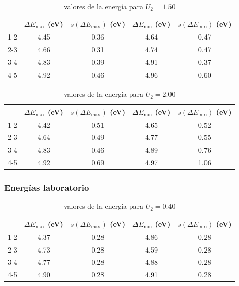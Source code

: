 \documentclass[12pt,a4paper]{article}
\numberwithin{equation}{section}
\numberwithin{figure}{section}
\begin{document}
 
 
\begin{table}[h!] \centering 
\begin{tabular}{ccccc} 
\hline  & $ \Delta E_{\max} $ (eV) & $s(\Delta E_{\max})$ (eV) & $ \Delta E_{\min} $ (eV) & $s(\Delta E_{\min})$ (eV) \\ \hline 
1-2 & 4.45 & 0.36 & 4.64 & 0.47 \\ 
2-3 & 4.66 & 0.31 & 4.74 & 0.47 \\ 
3-4 & 4.83 & 0.39 & 4.91 & 0.37 \\ 
4-5 & 4.92 & 0.46 & 4.96 & 0.60 \\ 
\hline 
\end{tabular}\caption{valores de la energía para $U_2=1.50$} 
\label{Tab:E-parabola-5} 
\end{table} 

\newpage
 
 
\begin{table}[h!] \centering 
\begin{tabular}{ccccc} 
\hline  & $ \Delta E_{\max} $ (eV) & $s(\Delta E_{\max})$ (eV) & $ \Delta E_{\min} $ (eV) & $s(\Delta E_{\min})$ (eV) \\ \hline 
1-2 & 4.42 & 0.51 & 4.65 & 0.52 \\ 
2-3 & 4.64 & 0.49 & 4.77 & 0.55 \\ 
3-4 & 4.83 & 0.46 & 4.89 & 0.76 \\ 
4-5 & 4.92 & 0.69 & 4.97 & 1.06 \\ 
\hline 
\end{tabular}\caption{valores de la energía para $U_2=2.00$} 
\label{Tab:E-parabola-6} 
\end{table} 


 \subsubsection{Energías laboratorio} \label{Subsubsec:6.1.4}

 \begin{table}[h!] \centering 
\begin{tabular}{ccccc} 
\hline  & $ \Delta E_{\max} $ (eV) & $s(\Delta E_{\max})$ (eV) & $ \Delta E_{\min} $ (eV) & $s(\Delta E_{\min})$ (eV) \\ \hline 
1-2 & 4.37 & 0.28 & 4.86 & 0.28 \\ 
2-3 & 4.73 & 0.28 & 4.59 & 0.28 \\ 
3-4 & 4.77 & 0.28 & 4.88 & 0.28 \\ 
4-5 & 4.90 & 0.28 & 4.91 & 0.28 \\ 
\hline 
\end{tabular}\caption{valores de la energía para $U_2=0.40$} 
\label{Tab:E-lab-1} 
\end{table} 
\end{document}
